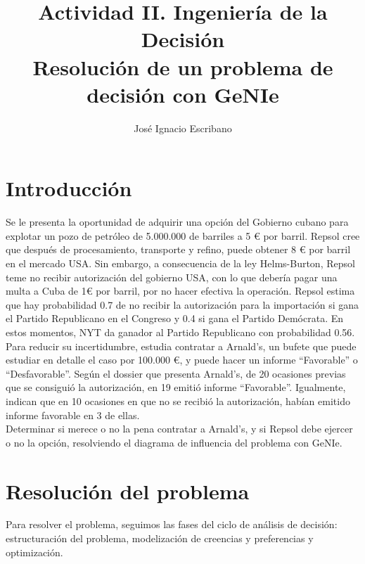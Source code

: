 \documentclass[12pt,a4paper,openright,final]{article}
\author{José Ignacio Escribano}
\title{Actividad II. Ingeniería de la Decisión \\ \textbf{Resolución de un problema de decisión con GeNIe}}
\begin{document}

\listoffigures
\thispagestyle{empty}
\newpage

\listoftables
\thispagestyle{empty}
\newpage

\tableofcontents
\thispagestyle{empty}
\newpage

\setcounter{page}{1}

\section{Introducción}

Se le presenta la oportunidad de adquirir una opción del Gobierno cubano para explotar un pozo de petróleo de 5.000.000 de barriles a 5 € por barril. Repsol cree que después de procesamiento, transporte y refino, puede obtener 8 € por barril en el mercado USA. Sin embargo, a consecuencia de la ley Helms-Burton, Repsol teme no recibir autorización del gobierno USA, con lo que debería pagar una multa a Cuba de 1€ por barril, por no hacer efectiva la operación. Repsol estima que hay probabilidad 0.7 de no recibir la autorización para la importación si gana el Partido Republicano en el Congreso  y 0.4 si gana el Partido Demócrata. En estos momentos, NYT da ganador al Partido Republicano con probabilidad 0.56.\\

Para reducir su incertidumbre, estudia contratar a Arnald’s, un bufete que puede estudiar en detalle el caso por 100.000 €, y puede hacer un informe ``Favorable'' o ``Desfavorable''. Según el dossier que presenta Arnald’s, de 20 ocasiones previas que se consiguió la autorización, en 19 emitió informe ``Favorable''. Igualmente, indican que en 10 ocasiones en que no se recibió la autorización, habían emitido informe favorable en 3 de ellas.\\
 
Determinar si merece o no la pena contratar a Arnald’s, y si Repsol debe ejercer o no la opción, resolviendo el  diagrama de influencia del problema con GeNIe.

\section{Resolución del problema}

Para resolver el problema, seguimos las fases del ciclo de análisis de decisión: estructuración del problema, modelización de creencias y preferencias y optimización.
\end{document}
